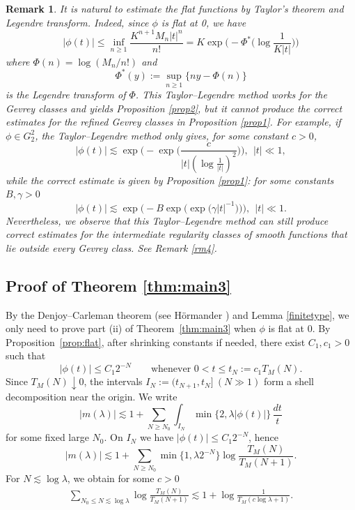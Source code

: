 \documentclass[11pt]{amsart}
\newtheorem{remark}[theorem]{Remark}
\newcommand{\la}{\lambda}
\newcommand{\ls}{\lesssim}
\newcommand{\1}{{\rm 1\hspace*{-0.4ex}%
			\rule{0.1ex}{1.52ex}\hspace*{0.2ex}}}
\numberwithin{equation}{section}
\begin{document}
\begin{remark}\label{rm3}{\rm It is natural to estimate the flat functions by Taylor's theorem and Legendre transform. Indeed, since $\phi$ is flat at 0, we have
\begin{equation}\label{taylor}
	|\phi(t)|\le \inf_{n\ge1}\frac{K^{n+1}M_n |t|^n}{n!}=K\exp\Big(-\Phi^*\Big(\log\frac1{K|t|}\Big)\Big)
\end{equation}
where $\Phi(n)=\log(M_n/n!)$ and 
\begin{equation}\label{leg}
	\Phi^*(y) := \sup_{n \geq 1}\{ny - \Phi(n)\}
\end{equation}
is the Legendre transform of $\Phi$. This Taylor--Legendre method works for the Gevrey classes and yields Proposition \ref{prop2}, but it cannot produce the correct estimates for the refined Gevrey classes in Proposition \ref{prop1}. For example, if $\phi\in G_2^2$, the Taylor--Legendre method only gives, for some constant $c>0$,
\[|\phi(t)|\ls \exp\Big(-\exp\Big(\frac{c}{|t|(\log\frac1{|t|})^2}\Big)\Big),\ \ |t|\ll1,\] 
while the correct estimate is given by Proposition \ref{prop1}: for some constants $B,\gamma>0$
\[|\phi(t)|\ls \exp\Big(-B\exp\Big(\exp\Big(\gamma |t|^{-1}\Big)\Big)\Big),\ \ |t|\ll1.\]
Nevertheless, we observe that this Taylor--Legendre method can still produce correct estimates for the intermediate regularity classes of smooth functions that lie outside every Gevrey class. See Remark \ref{rm4}.
}
\end{remark}


\subsection{Proof of Theorem \ref{thm:main3}}
	
By the Denjoy--Carleman theorem (see H\"ormander \cite[Theorem 1.3.8]{hor1}) and Lemma \ref{finitetype}, we only need to prove part (ii) of Theorem~\ref{thm:main3} when $\phi$ is flat at $0$. By Proposition~\ref{prop:flat}, after shrinking constants if needed, there exist $C_1,c_1>0$ such that
\[
|\phi(t)|\le C_1 2^{-N}
\qquad \text{whenever } 0<t\le t_N:=c_1 T_M(N).
\]
Since $T_M(N)\downarrow 0$, the intervals $I_N:=(t_{N+1},t_N]\ (N\gg 1)$
form a shell decomposition near the origin. We write
\[
|m(\lambda)|\lesssim 1+\sum_{N\ge N_0}\int_{I_N}\min\{2,\lambda|\phi(t)|\}\,\frac{dt}{t}
\]
for some fixed large $N_0$. On $I_N$ we have $|\phi(t)|\le C_1 2^{-N}$, hence
\begin{equation}\label{eq:shellsum}
	|m(\lambda)|
	\lesssim 1+\sum_{N\ge N_0}\min\{1,\lambda 2^{-N}\}\log\frac{T_M(N)}{T_M(N+1)}.
\end{equation}
For $N\ls\log\la$, we obtain for some $c>0$
\begin{align*}
	\sum_{N_0\le N\ls \log\la}\log\frac{T_M(N)}{T_M(N+1)}
	\lesssim 1+\log\frac1{T_M(c\log\la+1)}.
\end{align*}
\end{document}
